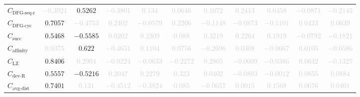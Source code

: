 \documentclass{standalone}
\newcommand{\dfgseqrationame}{\text{DFG-seq-r}}
\newcommand{\dfgseqratio}{C_{\dfgseqrationame}}
\newcommand{\dfgcycname}{\text{DFG-cyc}}
\newcommand{\dfgcyc}{C_{\dfgcycname}}
\newcommand{\numberofneighborhoodsname}{\text{succ}}
\newcommand{\numberofneighborhoods}{C_{\numberofneighborhoodsname}}
\newcommand{\lempelzivname}{\text{LZ}}
\newcommand{\lempelziv}{C_{\lempelzivname}}
\newcommand{\affinityname}{\text{affinity}}
\newcommand{\affinity}{C_{\affinityname}}
\newcommand{\deviationfromrandomname}{\text{dev-R}}
\newcommand{\deviationfromrandom}{C_{\deviationfromrandomname}}
\newcommand{\avgdistname}{\text{avg-dist}}
\newcommand{\avgdist}{C_{\avgdistname}}
\begin{document}
\begin{tabular}{lcccccccccc}
$\dfgseqratio$ & \textcolor{lightgray}{$-0.3921$} & $0.5262$ & \textcolor{lightgray}{$-0.3801$} & \textcolor{lightgray}{$0.134$} & \textcolor{lightgray}{$0.0646$} & \textcolor{lightgray}{$0.1072$} & \textcolor{lightgray}{$0.2413$} & \textcolor{lightgray}{$0.0458$} & \textcolor{lightgray}{$-0.0871$} & \textcolor{lightgray}{$-0.2145$} \\ 
$\dfgcyc$ & $0.7057$ & \textcolor{lightgray}{$-0.4753$} & \textcolor{lightgray}{$0.2402$} & \textcolor{lightgray}{$-0.0579$} & \textcolor{lightgray}{$0.2206$} & \textcolor{lightgray}{$-0.1148$} & \textcolor{lightgray}{$-0.0873$} & \textcolor{lightgray}{$-0.1101$} & \textcolor{lightgray}{$0.0423$} & \textcolor{lightgray}{$0.0639$} \\ 
$\numberofneighborhoods$ & $0.5468$ & $-0.5585$ & \textcolor{lightgray}{$0.0202$} & \textcolor{lightgray}{$0.2309$} & \textcolor{lightgray}{$0.088$} & \textcolor{lightgray}{$0.3219$} & \textcolor{lightgray}{$0.2264$} & \textcolor{lightgray}{$0.1919$} & \textcolor{lightgray}{$-0.0792$} & \textcolor{lightgray}{$-0.1821$} \\ 
$\affinity$ & \textcolor{lightgray}{$0.0375$} & $0.622$ & \textcolor{lightgray}{$-0.4651$} & \textcolor{lightgray}{$0.1104$} & \textcolor{lightgray}{$0.0756$} & \textcolor{lightgray}{$-0.2696$} & \textcolor{lightgray}{$0.0308$} & \textcolor{lightgray}{$-0.0667$} & \textcolor{lightgray}{$0.0105$} & \textcolor{lightgray}{$-0.0586$} \\ 
$\lempelziv$ & $0.8406$ & \textcolor{lightgray}{$0.2904$} & \textcolor{lightgray}{$-0.0224$} & \textcolor{lightgray}{$-0.0633$} & \textcolor{lightgray}{$-0.2272$} & \textcolor{lightgray}{$0.2805$} & \textcolor{lightgray}{$-0.0609$} & \textcolor{lightgray}{$-0.0386$} & \textcolor{lightgray}{$0.0642$} & \textcolor{lightgray}{$-0.1327$} \\ 
$\deviationfromrandom$ & $0.5557$ & $-0.5216$ & \textcolor{lightgray}{$0.2047$} & \textcolor{lightgray}{$0.2279$} & \textcolor{lightgray}{$0.323$} & \textcolor{lightgray}{$0.0402$} & \textcolor{lightgray}{$-0.0893$} & \textcolor{lightgray}{$-0.0012$} & \textcolor{lightgray}{$0.0855$} & \textcolor{lightgray}{$0.0884$} \\ 
$\avgdist$ & $0.7401$ & \textcolor{lightgray}{$0.131$} & \textcolor{lightgray}{$-0.4512$} & \textcolor{lightgray}{$-0.3824$} & \textcolor{lightgray}{$0.085$} & \textcolor{lightgray}{$-0.0657$} & \textcolor{lightgray}{$0.0015$} & \textcolor{lightgray}{$0.1568$} & \textcolor{lightgray}{$0.0676$} & \textcolor{lightgray}{$0.0401$} \\ 

\end{tabular}
\end{document}
